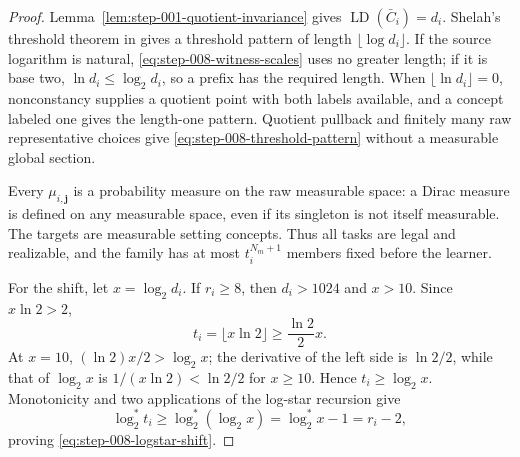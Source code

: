 \begin{proof}
Lemma~\ref{lem:step-001-quotient-invariance} gives
\(\operatorname{LD}(\bar C_i)=d_i\).  Shelah's threshold theorem in
\citet{alonLivniMalliarisMoran2019} gives a threshold pattern of length
\(\lfloor\log d_i\rfloor\).  If the source logarithm is natural,
\eqref{eq:step-008-witness-scales} uses no greater length; if it is base
two, \(\ln d_i\le\log_2d_i\), so a prefix has the required length.  When
\(\lfloor\ln d_i\rfloor=0\), nonconstancy supplies a quotient point with
both labels available, and a concept labeled one gives the length-one
pattern.  Quotient pullback and finitely many raw representative choices
give \eqref{eq:step-008-threshold-pattern} without a measurable global
section.

Every \(\mu_{i,\mathbf j}\) is a probability measure on the raw measurable
space: a Dirac measure is defined on any measurable space, even if its
singleton is not itself measurable.  The targets are measurable setting
concepts.  Thus all tasks are legal and realizable, and the family has at
most \(t_i^{N_m+1}\) members fixed before the learner.

For the shift, let \(x=\log_2d_i\).  If \(r_i\ge8\), then \(d_i>1024\)
and \(x>10\).  Since \(x\ln2>2\),
\begin{equation}\label{eq:step-008-threshold-length}
t_i=\lfloor x\ln2\rfloor\ge\frac{\ln2}{2}x.
\end{equation}
At \(x=10\), \((\ln2)x/2>\log_2x\); the derivative of the left side is
\(\ln2/2\), while that of \(\log_2x\) is
\(1/(x\ln2)<\ln2/2\) for \(x\ge10\).  Hence
\(t_i\ge\log_2x\).  Monotonicity and two applications of the log-star
recursion give
\[
\log_2^*t_i
\ge\log_2^*(\log_2x)
=\log_2^*x-1=r_i-2,
\]
proving \eqref{eq:step-008-logstar-shift}.
\end{proof}

